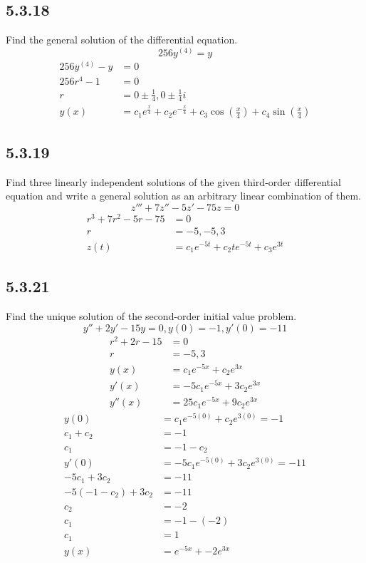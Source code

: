 \documentclass{article}
\begin{document}
\subsection{5.3.18}
Find the general solution of the differential equation.
$$ 256y^{(4)} = y $$
\begin{align*}
	256y^{(4)} - y & = 0 \\
	256r^4 - 1 & = 0 \\
	r & = 0 \pm \frac{1}{4}, 0 \pm \frac{1}{4}i \\
	y(x) & = c_1e^{\frac{x}{4}} + c_2e^{-\frac{x}{4}} + c_3\cos \left( \frac{x}{4} \right) + c_4\sin \left( \frac{x}{4} \right)
\end{align*}

\subsection{5.3.19}
Find three linearly independent solutions of the given third-order differential equation and write a general solution as an arbitrary linear combination of them.
$$ z''' + 7z'' - 5z' - 75z = 0 $$
\begin{align*}
	r^3 + 7r^2 - 5r - 75 & = 0 \\
	r & = -5, -5, 3 \\
	z(t) & = c_1e^{-5t} + c_2te^{-5t} + c_3e^{3t}
\end{align*}

\subsection{5.3.21}
Find the unique solution of the second-order initial value problem.
$$ y'' + 2y' - 15y = 0, y(0) = -1, y'(0) = -11 $$
\begin{align*}
	r^2 + 2r - 15 & = 0 \\
	r & = -5, 3 \\
	y(x) & = c_1e^{-5x} + c_2e^{3x} \\
	y'(x) & = -5c_1e^{-5x} + 3c_2e^{3x} \\
	y''(x) & = 25c_1e^{-5x} + 9c_2e^{3x}
\end{align*}
\begin{align*}
	y(0) & = c_1e^{-5(0)} + c_2e^{3(0)} = -1 \\
	c_1 + c_2 & = -1 \\
	c_1 & = -1 - c_2 \\
	y'(0) & = -5c_1e^{-5(0)} + 3c_2e^{3(0)} = -11 \\
	-5c_1 + 3c_2 & = -11 \\
	-5( -1 - c_2 ) + 3c_2 & = -11 \\
	c_2 & = -2 \\
	c_1 & = -1 - (-2) \\
	c_1 & = 1 \\
	y(x) & = e^{-5x} + -2e^{3x}
\end{align*}
\end{document}
